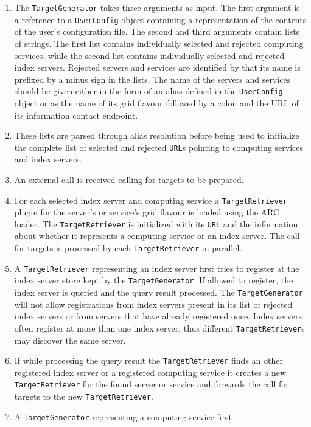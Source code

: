 \documentclass{book}
\newcommand{\TargetGenerator}{\texttt{TargetGenerator}}
\newcommand{\TargetRetriever}{\texttt{TargetRetriever}}
\newcommand{\URL}{\texttt{URL}}
\newcommand{\UserConfig}{\texttt{UserConfig}}
\begin{document}
\begin{enumerate}
\item{The {\TargetGenerator} takes three arguments as input. The first
  argument is a reference to a {\UserConfig} object containing a
  representation of the contents of the user's configuration file. The
  second and third arguments contain lists of strings. The first list
  contains individually selected and rejected computing services,
  while the second list contains individually selected and rejected
  index servers. Rejected servers and services are identified by that
  its name is prefixed by a minus sign in the lists. The name of the
  servers and services should be given either in the form of an alias
  defined in the {\UserConfig} object or as the name of its grid
  flavour followed by a colon and the URL of its information contact
  endpoint.}
\item{These lists are parsed through alias resolution before being
  used to initialize the complete list of selected and rejected
  {\URL}s pointing to computing services and index servers.}
\item{An external call is received calling for targets to be
  prepared.}
\item{For each selected index server and computing service a
  {\TargetRetriever} plugin for the server's or service's grid flavour
  is loaded using the ARC loader. The {\TargetRetriever} is
  initialized with its {\URL} and the information about whether it
  represents a computing service or an index server. The call for
  targets is processed by each {\TargetRetriever} in parallel.}
\item{A {\TargetRetriever} representing an index server first tries to
  register at the index server store kept by the {\TargetGenerator}.
  If allowed to register, the index server is queried and the query
  result processed. The {\TargetGenerator} will not allow
  registrations from index servers present in its list of rejected
  index servers or from servers that have already registered
  once. Index servers often register at more than one index server,
  thus different {\TargetRetriever}s may discover the same server.}
\item{If while processing the query result the {\TargetRetriever}
  finds an other registered index server or a registered computing
  service it creates a new {\TargetRetriever} for the found server or
  service and forwards the call for targets to the new
  {\TargetRetriever}.}
\item{A {\TargetGenerator} representing a computing service first
}
\end{enumerate}
\end{document}
